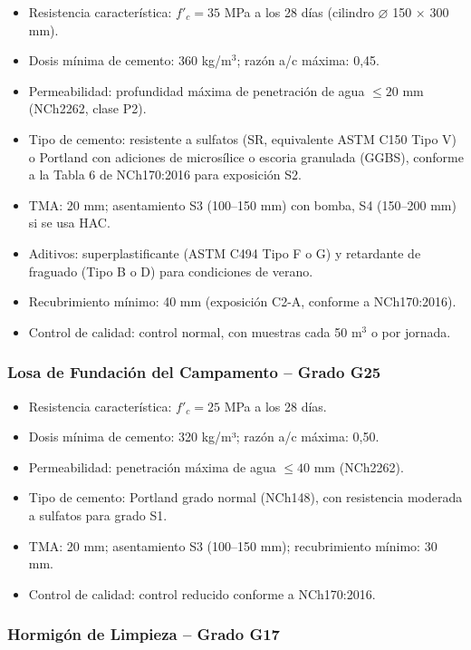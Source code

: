\begin{itemize}
    \item Resistencia característica: $f'_c = 35$ MPa a los 28 días (cilindro $\varnothing$ 150 $\times$ 300 mm).
    \item Dosis mínima de cemento: 360 kg/m$^3$; razón a/c máxima: 0{,}45.
    \item Permeabilidad: profundidad máxima de penetración de agua $\leq 20$ mm (NCh2262, clase P2).
    \item Tipo de cemento: resistente a sulfatos (SR, equivalente ASTM C150 Tipo V) o Portland con adiciones de microsílice o escoria granulada (GGBS), conforme a la Tabla 6 de NCh170:2016 para exposición S2.
    \item TMA: 20 mm; asentamiento S3 (100--150 mm) con bomba, S4 (150--200 mm) si se usa HAC.
    \item Aditivos: superplastificante (ASTM C494 Tipo F o G) y retardante de fraguado (Tipo B o D) para condiciones de verano.
    \item Recubrimiento mínimo: 40 mm (exposición C2-A, conforme a NCh170:2016).
    \item Control de calidad: control normal, con muestras cada 50 m$^3$ o por jornada.
\end{itemize}

\subsubsection{Losa de Fundación del Campamento -- Grado G25}

\begin{itemize}
    \item Resistencia característica: $f'_c = 25$ MPa a los 28 días.
    \item Dosis mínima de cemento: 320 kg/m³; razón a/c máxima: 0{,}50.
    \item Permeabilidad: penetración máxima de agua $\leq 40$ mm (NCh2262).
    \item Tipo de cemento: Portland grado normal (NCh148), con resistencia moderada a sulfatos para grado S1.
    \item TMA: 20 mm; asentamiento S3 (100--150 mm); recubrimiento mínimo: 30 mm.
    \item Control de calidad: control reducido conforme a NCh170:2016.
\end{itemize}

\subsubsection{Hormigón de Limpieza -- Grado G17}


